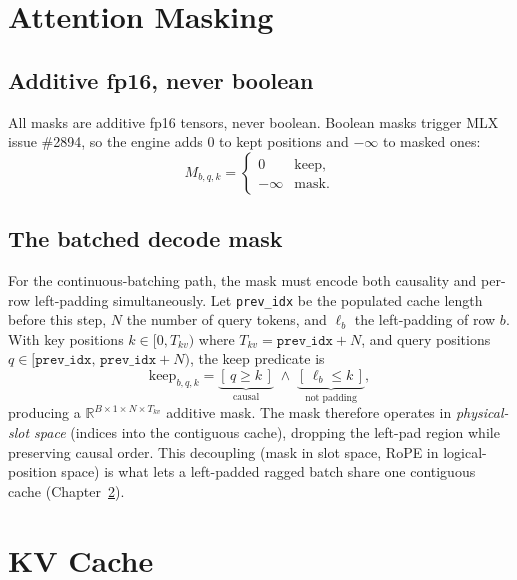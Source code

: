 \documentclass[11pt,a4paper]{report}
\newcommand{\R}{\mathbb{R}}
\newcommand{\code}[1]{\texttt{#1}}
\begin{document}
\chapter{Attention Masking}
\label{ch:mask}

\section{Additive fp16, never boolean}
All masks are additive fp16 tensors, never boolean. Boolean masks trigger MLX issue
\#2894, so the engine adds $0$ to kept positions and $-\infty$ to masked ones:
\begin{equation}
  M_{b,q,k} =
  \begin{cases} 0 & \text{keep},\\ -\infty & \text{mask}. \end{cases}
\end{equation}

\section{The batched decode mask}
For the continuous-batching path, the mask must encode both causality and per-row
left-padding simultaneously. Let \code{prev\_idx} be the populated cache length
before this step, $N$ the number of query tokens, and $\ell_b$ the left-padding of
row $b$. With key positions $k \in [0, T_{kv})$ where $T_{kv}=\code{prev\_idx}+N$,
and query positions $q \in [\code{prev\_idx},\, \code{prev\_idx}+N)$, the keep
predicate is
\begin{equation}
  \text{keep}_{b,q,k} = \underbrace{[\,q \ge k\,]}_{\text{causal}} \;\wedge\; \underbrace{[\,\ell_b \le k\,]}_{\text{not padding}},
\end{equation}
producing a $\R^{B\times 1\times N\times T_{kv}}$ additive mask. The mask therefore
operates in \emph{physical-slot space} (indices into the contiguous cache),
dropping the left-pad region while preserving causal order. This decoupling (mask
in slot space, RoPE in logical-position space) is what lets a left-padded ragged
batch share one contiguous cache (Chapter~\ref{ch:cache}).

\chapter{KV Cache}
\label{ch:cache}
\end{document}
